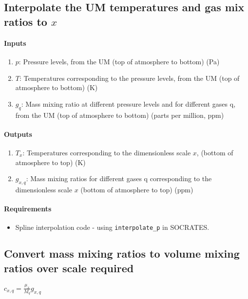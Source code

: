 \subsection{Interpolate the UM temperatures and gas mix ratios to $x$}

   \paragraph{Inputs}
   \begin{enumerate}
   \item $p$: Pressure levels, from the UM (top of atmosphere to 
     bottom) (Pa)
   \item $T$: Temperatures corresponding to the pressure levels, 
     from the UM (top of atmosphere to bottom) (K)
   \item $g_q$: Mass mixing ratio at different pressure levels 
     and for different gases q, from the UM (top of atmosphere to bottom)
     (parts per million, ppm)
   \end{enumerate}

   \paragraph{Outputs}
   \begin{enumerate}
   \item $T_x$: Temperatures corresponding to the dimensionless scale $x$, 
     (bottom of atmosphere to top) (K)
   \item $g_{x,q}$: Mass mixing ratios for different gases q corresponding 
     to the dimensionless scale $x$ (bottom of atmosphere to top) (ppm)
   \end{enumerate}

   \paragraph{Requirements}
   \begin{itemize}   
   \item Spline interpolation code - using {\tt interpolate\_p} in 
     SOCRATES.
   \end{itemize}

\subsection{Convert mass mixing ratios to volume mixing ratios over 
  scale required}

   $c_{x,q} = \frac{\mu_x}{M_q}g_{x,q}$ \\

